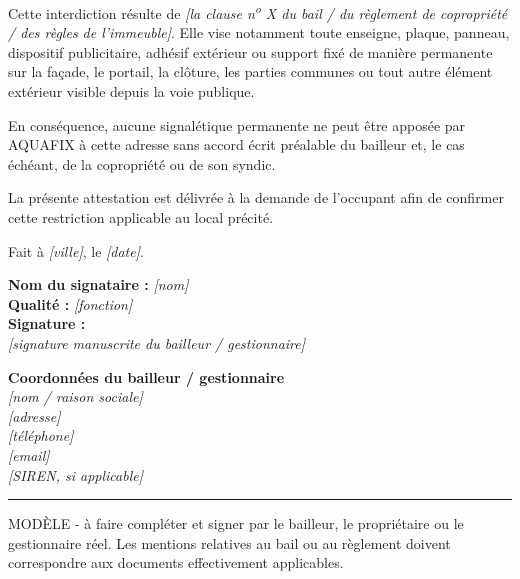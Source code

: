 \documentclass[10pt,a4paper]{article}
\newcommand{\field}[1]{\textcolor{muted}{\textit{[#1]}}}
\begin{document}
\vspace{3mm}

Cette interdiction résulte de \field{la clause n\textsuperscript{o} X du bail / du règlement de copropriété / des règles de l'immeuble}. Elle vise notamment toute enseigne, plaque, panneau, dispositif publicitaire, adhésif extérieur ou support fixé de manière permanente sur la façade, le portail, la clôture, les parties communes ou tout autre élément extérieur visible depuis la voie publique.

\vspace{3mm}

En conséquence, aucune signalétique permanente ne peut être apposée par AQUAFIX à cette adresse sans accord écrit préalable du bailleur et, le cas échéant, de la copropriété ou de son syndic.

\vspace{3mm}

La présente attestation est délivrée à la demande de l'occupant afin de confirmer cette restriction applicable au local précité.

\vspace{5mm}

Fait à \field{ville}, le \field{date}.

\vspace{7mm}

\noindent
\begin{minipage}[t]{0.48\textwidth}
{\bfseries Nom du signataire :} \field{nom}\\[3pt]
{\bfseries Qualité :} \field{fonction}\\[8pt]
{\bfseries Signature :}\\[11mm]
\field{signature manuscrite du bailleur / gestionnaire}
\end{minipage}
\hfill
\begin{minipage}[t]{0.44\textwidth}
\setlength{\fboxsep}{6pt}
\colorbox{panel}{%
\begin{minipage}{0.92\linewidth}
\small
\textbf{Coordonnées du bailleur / gestionnaire}\\[3pt]
\field{nom / raison sociale}\\
\field{adresse}\\
\field{téléphone}\\
\field{email}\\
\field{SIREN, si applicable}
\end{minipage}}
\end{minipage}

\vspace{5mm}
\noindent\color{rule}\rule{\textwidth}{0.5pt}\color{muted}
\vspace{2mm}
{\footnotesize\sffamily MODÈLE - à faire compléter et signer par le bailleur, le propriétaire ou le gestionnaire réel. Les mentions relatives au bail ou au règlement doivent correspondre aux documents effectivement applicables.}
\end{document}
